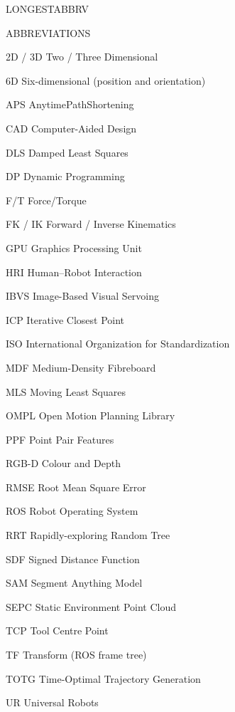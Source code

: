 \begin{theglossary}{LONGESTABBRV}

\item [ABBREVIATIONS]
\item[]

\item[2D / 3D] Two / Three Dimensional
\item[6D] Six-dimensional (position and orientation)
\item[APS] AnytimePathShortening
\item[CAD] Computer-Aided Design
\item[DLS] Damped Least Squares
\item[DP] Dynamic Programming
\item[F/T] Force/Torque
\item[FK / IK] Forward / Inverse Kinematics
\item[GPU] Graphics Processing Unit
\item[HRI] Human--Robot Interaction
\item[IBVS] Image-Based Visual Servoing
\item[ICP] Iterative Closest Point
\item[ISO] International Organization for Standardization
\item[MDF] Medium-Density Fibreboard
\item[MLS] Moving Least Squares
\item[OMPL] Open Motion Planning Library
\item[PPF] Point Pair Features
\item[RGB-D] Colour and Depth
\item[RMSE] Root Mean Square Error
\item[ROS] Robot Operating System
\item[RRT] Rapidly-exploring Random Tree
\item[SDF] Signed Distance Function
\item[SAM] Segment Anything Model
\item[SEPC] Static Environment Point Cloud
\item[TCP] Tool Centre Point
\item[TF] Transform (ROS frame tree)
\item[TOTG] Time-Optimal Trajectory Generation
\item[UR] Universal Robots

\end{theglossary}
